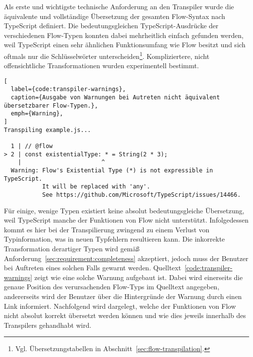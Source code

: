 Als erste und wichtigste technische Anforderung an den Transpiler wurde die äquivalente und vollständige Übersetzung der gesamten Flow-Syntax nach TypeScript definiert. Die bedeutungsgleichen TypeScript-Ausdrücke der verschiedenen Flow-Typen konnten dabei mehrheitlich einfach gefunden werden, weil TypeScript einen sehr ähnlichen Funktionsumfang wie Flow besitzt und sich oftmals nur die Schlüsselwörter unterscheiden\footnote{Vgl. Übersetzungstabellen in Abschnitt~\ref{sec:flow-transpilation}.}. Kompliziertere, nicht offensichtliche Transformationen wurden experimentell bestimmt.

\begin{lstlisting}[
  label={code:transpiler-warnings},
  caption={Ausgabe von Warnungen bei Autreten nicht äquivalent übersetzbarer Flow-Typen.},
  emph={Warning},
]
Transpiling example.js...

  1 | // @flow
> 2 | const existentialType: * = String(2 * 3);
    |                       ^
  Warning: Flow's Existential Type (*) is not expressible in TypeScript.
           It will be replaced with 'any'.
           See https://github.com/Microsoft/TypeScript/issues/14466.
\end{lstlisting}

Für einige, wenige Typen existiert keine absolut bedeutungsgleiche Übersetzung, weil TypeScript manche der Funktionen von Flow nicht unterstützt. Infolgedessen kommt es hier bei der Transpilierung zwingend zu einem Verlust von Typinformation, was in neuen Typfehlern resultieren kann. Die inkorrekte Transformation derartiger Typen wird gemäß Anforderung~\ref{sec:requirement:completeness} akzeptiert, jedoch muss der Benutzer bei Auftreten eines solchen Falls gewarnt werden. Quelltext~\ref{code:transpiler-warnings} zeigt wie eine solche Warnung aufgebaut ist. Dabei wird einerseits die genaue Position des verursachenden Flow-Typs im Quelltext angegeben, andererseits wird der Benutzer über die Hintergründe der Warnung durch einen Link informiert. Nachfolgend wird dargelegt, welche der Funktionen von Flow nicht absolut korrekt übersetzt werden können und wie dies jeweils innerhalb des Transpilers gehandhabt wird.

